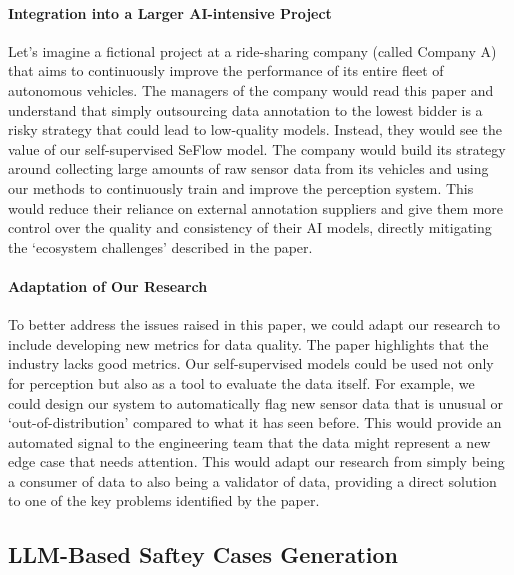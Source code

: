 \documentclass{article}
\begin{document}
\paragraph{Integration into a Larger AI-intensive Project}
Let's imagine a fictional project at a ride-sharing company (called Company A) that aims to continuously improve the performance of its entire fleet of autonomous vehicles. The managers of the company would read this paper and understand that simply outsourcing data annotation to the lowest bidder is a risky strategy that could lead to low-quality models. Instead, they would see the value of our self-supervised SeFlow model. The company would build its strategy around collecting large amounts of raw sensor data from its vehicles and using our methods to continuously train and improve the perception system. This would reduce their reliance on external annotation suppliers and give them more control over the quality and consistency of their AI models, directly mitigating the `ecosystem challenges' described in the paper.

\paragraph{Adaptation of Our Research}
To better address the issues raised in this paper, we could adapt our research to include developing new metrics for data quality. The paper highlights that the industry lacks good metrics. Our self-supervised models could be used not only for perception but also as a tool to evaluate the data itself. For example, we could design our system to automatically flag new sensor data that is unusual or `out-of-distribution' compared to what it has seen before. This would provide an automated signal to the engineering team that the data might represent a new edge case that needs attention. This would adapt our research from simply being a consumer of data to also being a validator of data, providing a direct solution to one of the key problems identified by the paper.

\subsection{LLM-Based Saftey Cases Generation~\cite{11030020}}
\end{document}
